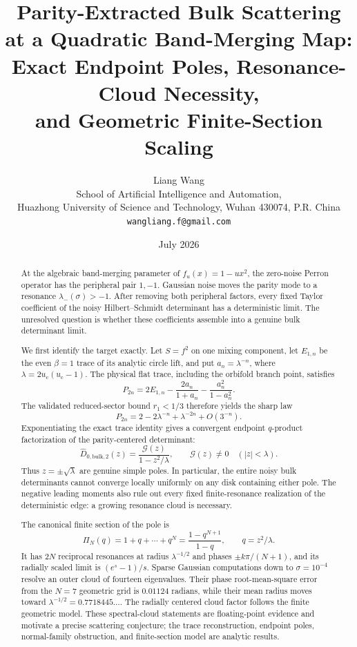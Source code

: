 \documentclass[11pt]{article}
\title{\textbf{Parity-Extracted Bulk Scattering}\\
\textbf{at a Quadratic Band-Merging Map:}\\[0.35em]
\large Exact Endpoint Poles, Resonance-Cloud Necessity,\\
and Geometric Finite-Section Scaling}
\author{Liang Wang\\
\small School of Artificial Intelligence and Automation,\\[-0.2em]
\small Huazhong University of Science and Technology, Wuhan 430074, P.R. China\\
\small \texttt{wangliang.f@gmail.com}}
\date{July 2026}
\theoremstyle{definition}
\theoremstyle{remark}
\newcommand{\cG}{\mathcal G}
\begin{document}
\maketitle

\begin{abstract}
At the algebraic band-merging parameter of $f_u(x)=1-u x^2$, the
zero-noise Perron operator has the peripheral pair $1,-1$.  Gaussian noise
moves the parity mode to a resonance $\lambda_-(\sigma)>-1$.  After removing
both peripheral factors, every fixed Taylor coefficient of the noisy
Hilbert--Schmidt determinant has a deterministic limit.  The unresolved
question is whether these coefficients assemble into a genuine bulk
determinant limit.

We first identify the target exactly.  Let $S=f^2$ on one mixing component,
let $E_{1,n}$ be the even $\beta=1$ trace of its analytic circle lift, and put
$a_n=\lambda^{-n}$, where $\lambda=2u_{\mathrm c}(u_{\mathrm c}-1)$.  The
physical flat trace, including the orbifold branch point, satisfies
\[
 P_{2n}=2E_{1,n}
 -\frac{2a_n}{1+a_n}
 -\frac{a_n^2}{1-a_n^2}.
\]
The validated reduced-sector bound $r_1<1/3$ therefore yields the sharp law
\[
 P_{2n}=2-2\lambda^{-n}+\lambda^{-2n}+O(3^{-n}).
\]
Exponentiating the exact trace identity gives a convergent endpoint
$q$-product factorization of the parity-centered determinant:
\[
 \boxed{
 \widehat D_{0,\mathrm{bulk},2}(z)
 =\frac{\cG(z)}{1-z^2/\lambda}},
 \qquad
 \cG(z)\ne0\quad(|z|<\lambda).
\]
Thus $z=\pm\sqrt\lambda$ are genuine simple poles.  In particular, the
entire noisy bulk determinants cannot converge locally uniformly on any disk
containing either pole.  The negative leading moments also rule out every
fixed finite-resonance realization of the deterministic edge: a growing
resonance cloud is necessary.

The canonical finite section of the pole is
\[
 \Pi_N(q)=1+q+\cdots+q^N=\frac{1-q^{N+1}}{1-q},
 \qquad q=z^2/\lambda.
\]
It has $2N$ reciprocal resonances at radius $\lambda^{-1/2}$ and phases
$\pm k\pi/(N+1)$, and its radially scaled limit is
$(e^s-1)/s$.  Sparse Gaussian computations down to $\sigma=10^{-4}$ resolve
an outer cloud of fourteen eigenvalues.  Their phase root-mean-square error
from the $N=7$ geometric grid is $0.01124$ radians, while their mean radius
moves toward $\lambda^{-1/2}=0.7718445\ldots$.  The radially centered cloud
factor follows the finite geometric model.  These spectral-cloud statements
are floating-point evidence and motivate a precise scattering conjecture;
the trace reconstruction, endpoint poles, normal-family obstruction, and
finite-section model are analytic results.
\end{abstract}
\end{document}
